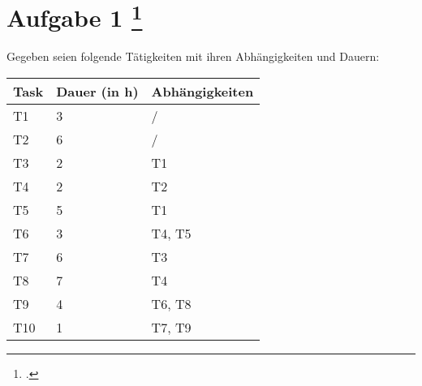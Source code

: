 \documentclass{lehramt-informatik-aufgabe}
\begin{document}
\let\f=\footnotesize
\let\FZ=\liCpmFruehesterI
\let\SZ=\liCpmSpaetesterI

\section{Aufgabe 1
\footcite{66116:2021:03}}

Gegeben seien folgende Tätigkeiten mit ihren Abhängigkeiten und Dauern:

\begin{center}
\begin{tabular}{lll}
\hline
Task & Dauer (in h) & Abhängigkeiten \\\hline
T1   & 3            & / \\
T2   & 6            & / \\
T3   & 2            & T1 \\
T4   & 2            & T2 \\
T5   & 5            & T1 \\
T6   & 3            & T4, T5 \\
T7   & 6            & T3 \\
T8   & 7            & T4 \\
T9   & 4            & T6, T8 \\
T10  & 1            & T7, T9 \\\hline
\end{tabular}
\end{center}
\end{document}

